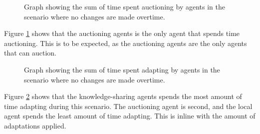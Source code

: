 \begin{figure}[H]
    \centering
        
    \caption{Graph showing the sum of time spent auctioning by agents in the scenario where no changes are made overtime.}
    \label{fig:auctioning-time-no-change}
\end{figure}

Figure \ref{fig:auctioning-time-no-change} shows that the auctioning agents is the only agent that spends time auctioning. This is to be expected, as the auctioning agents are the only agents that can auction.

\begin{figure}[H]
    \centering
        
    \caption{Graph showing the sum of time spent adapting by agents in the scenario where no changes are made overtime.}
    \label{fig:adapting-time-no-change}
\end{figure}

Figure \ref{fig:adapting-time-no-change} shows that the knowledge-sharing agents spends the most amount of time adapting during this scenario. The auctioning agent is second, and the local agent spends the least amount of time adapting. This is inline with the amount of adaptations applied.
